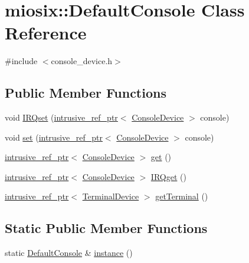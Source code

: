 \hypertarget{classmiosix_1_1_default_console}{\section{miosix\-:\-:Default\-Console Class Reference}
\label{classmiosix_1_1_default_console}
}


{\ttfamily \#include $<$console\-\_\-device.\-h$>$}

\subsection*{Public Member Functions}
\begin{DoxyCompactItemize}
\item 
void \hyperlink{classmiosix_1_1_default_console_abaec87e68e90acc9d1e1bab73ef96622}{I\-R\-Qset} (\hyperlink{classmiosix_1_1intrusive__ref__ptr}{intrusive\-\_\-ref\-\_\-ptr}$<$ \hyperlink{classmiosix_1_1_console_device}{Console\-Device} $>$ console)
\item 
void \hyperlink{classmiosix_1_1_default_console_a1762a1605ac63dd9a369d5d053f7a503}{set} (\hyperlink{classmiosix_1_1intrusive__ref__ptr}{intrusive\-\_\-ref\-\_\-ptr}$<$ \hyperlink{classmiosix_1_1_console_device}{Console\-Device} $>$ console)
\item 
\hyperlink{classmiosix_1_1intrusive__ref__ptr}{intrusive\-\_\-ref\-\_\-ptr}$<$ \hyperlink{classmiosix_1_1_console_device}{Console\-Device} $>$ \hyperlink{classmiosix_1_1_default_console_af5afb386e33e8f02067d04f66da99c1a}{get} ()
\item 
\hyperlink{classmiosix_1_1intrusive__ref__ptr}{intrusive\-\_\-ref\-\_\-ptr}$<$ \hyperlink{classmiosix_1_1_console_device}{Console\-Device} $>$ \hyperlink{classmiosix_1_1_default_console_af3fc3053af0b3a4061433aea6f7187b7}{I\-R\-Qget} ()
\item 
\hyperlink{classmiosix_1_1intrusive__ref__ptr}{intrusive\-\_\-ref\-\_\-ptr}$<$ \hyperlink{classmiosix_1_1_terminal_device}{Terminal\-Device} $>$ \hyperlink{classmiosix_1_1_default_console_abba6810e78a777cfbc9862d7b0038283}{get\-Terminal} ()
\end{DoxyCompactItemize}
\subsection*{Static Public Member Functions}
\begin{DoxyCompactItemize}
\item 
static \hyperlink{classmiosix_1_1_default_console}{Default\-Console} \& \hyperlink{classmiosix_1_1_default_console_af8ca2910d652b57755d4319abb0d2136}{instance} ()
\end{DoxyCompactItemize}


